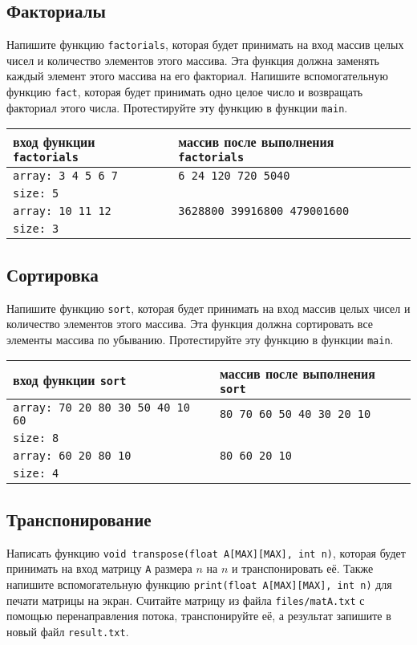 \documentclass{article}
\begin{document}
\subsection{Факториалы}
Напишите функцию \texttt{factorials}, которая будет принимать на вход массив целых чисел и количество элементов этого массива. Эта функция должна заменять каждый элемент этого массива на его факториал. Напишите вспомогательную функцию \texttt{fact}, которая будет принимать одно целое число и возвращать факториал этого числа. Протестируйте эту функцию в функции \texttt{main}.
\begin{center}
\begin{tabular}{ l | l }
 вход функции \texttt{factorials} & массив после выполнения \texttt{factorials} \\ \hline
 \texttt{array: 3 4 5 6 7} & \texttt{6 24 120 720 5040} \\
 \texttt{size: 5} & \\ \hline
 \texttt{array: 10 11 12} & \texttt{3628800 39916800 479001600} \\
 \texttt{size: 3} & \\
\end{tabular}
\end{center} 

\subsection{Сортировка}
Напишите функцию \texttt{sort}, которая будет принимать на вход массив целых чисел и количество элементов этого массива. Эта функция должна сортировать все элементы массива по убыванию. Протестируйте эту функцию в функции \texttt{main}.
\begin{center}
\begin{tabular}{ l | l }
 вход функции \texttt{sort} & массив после выполнения \texttt{sort} \\ \hline
 \texttt{array: 70 20 80 30 50 40 10 60} & \texttt{80 70 60 50 40 30 20 10} \\
 \texttt{size: 8} & \\ \hline
 \texttt{array: 60 20 80 10} & \texttt{80 60 20 10} \\
 \texttt{size: 4} & \\
\end{tabular}
\end{center} 


\subsection{Транспонирование}
Написать функцию \texttt{void transpose(float A[MAX][MAX], int n)}, которая будет принимать на вход матрицу \texttt{A} размера $n$ на $n$ и транспонировать её. Также напишите вспомогательную функцию \texttt{print(float A[MAX][MAX], int n)} для печати матрицы на экран. Считайте матрицу из файла \texttt{files/matA.txt} с помощью перенаправления потока, транспонируйте её, а результат запишите в новый файл \texttt{result.txt}.\\
\end{document}
